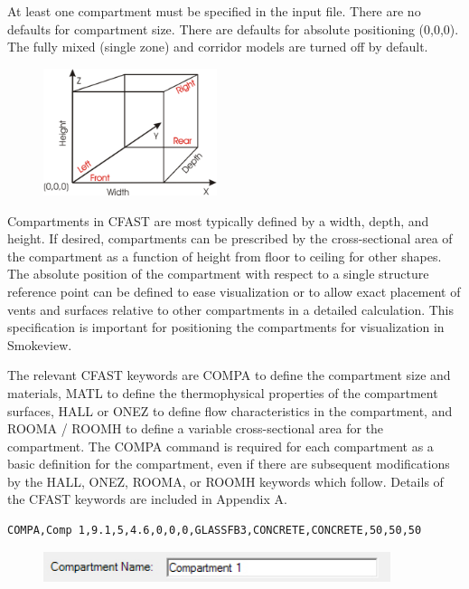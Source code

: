 At least one compartment must be specified in the input file.  There are no defaults for compartment size. There are defaults for absolute positioning (0,0,0). The fully mixed (single zone) and corridor models are turned off by default.

\begin{figure}
  \includegraphics[width=2.0in]{FIGURES/Input_File/CFAST_Coordinates}
\end{figure}

\label{Compartment_Geometry}Compartments in CFAST are most typically defined by a width, depth, and height.  If desired, compartments can be prescribed by the cross-sectional area of the compartment as a function of height from floor to ceiling for other shapes. The absolute position of the compartment with respect to a single structure reference point can be defined to ease visualization or to allow exact placement of vents and surfaces relative to other compartments in a detailed calculation. This specification is important for positioning the compartments for visualization in Smokeview.

The relevant CFAST keywords are COMPA to define the compartment size and materials, MATL to define the thermophysical properties of the compartment surfaces, HALL or ONEZ to define flow characteristics in the compartment, and ROOMA / ROOMH to define a variable cross-sectional area for the compartment. The COMPA command is required for each compartment as a basic definition for the compartment, even if there are subsequent modifications by the HALL, ONEZ, ROOMA, or ROOMH keywords which follow.  Details of the CFAST keywords are included in Appendix A.

\begin{lstlisting}
COMPA,Comp 1,9.1,5,4.6,0,0,0,GLASSFB3,CONCRETE,CONCRETE,50,50,50
\end{lstlisting}

\begin{figure}[h!]
\begin{center}
\includegraphics[width=4.0in]{FIGURES/Input_File/Compartment_Name}
\end{center}
\end{figure}

